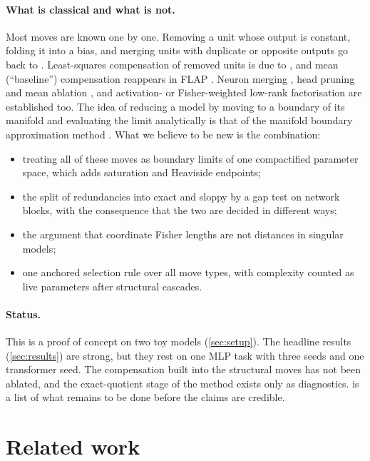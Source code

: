 \documentclass[11pt,a4paper]{article}
\theoremstyle{definition}
\begin{document}
\paragraph{What is classical and what is not.}
Most moves are known one by one. Removing a unit whose output is constant, folding it
into a bias, and merging units with duplicate or opposite outputs go back to
\citet{sietsma1988pruning}. Least-squares compensation of removed units is due to
\citet{castellano1997iterative}, and mean (``baseline'') compensation reappears in
FLAP \citep{an2024flap}. Neuron merging \citep{srinivas2015datafree,kim2020merging},
head pruning and mean ablation \citep{michel2019sixteen,voita2019heads,wang2023ioi},
and activation- or Fisher-weighted low-rank factorisation
\citep{hsu2022fwsvd,yuan2023asvd,wang2025svdllm} are established too. The idea of
reducing a model by moving to a boundary of its manifold and evaluating the limit
analytically is that of the manifold boundary approximation method
\citep{transtrum2014}. What we believe to be new is the combination:
\begin{itemize}
\item treating all of these moves as boundary limits of one compactified parameter
space, which adds saturation and Heaviside endpoints;
\item the split of redundancies into exact and sloppy by a gap test on network blocks,
with the consequence that the two are decided in different ways;
\item the argument that coordinate Fisher lengths are not distances in singular models;
\item one anchored selection rule over all move types, with complexity counted as live
parameters after structural cascades.
\end{itemize}

\paragraph{Status.} This is a proof of concept on two toy models
(\cref{sec:setup}). The headline results (\cref{sec:results}) are strong, but they rest
on one MLP task with three seeds and one transformer seed. The compensation built
into the structural moves has not been ablated, and the exact-quotient stage of the
method exists only as diagnostics.  is a list of what remains to be
done before the claims are credible.

\section{Related work}
\label{sec:related}
\end{document}
